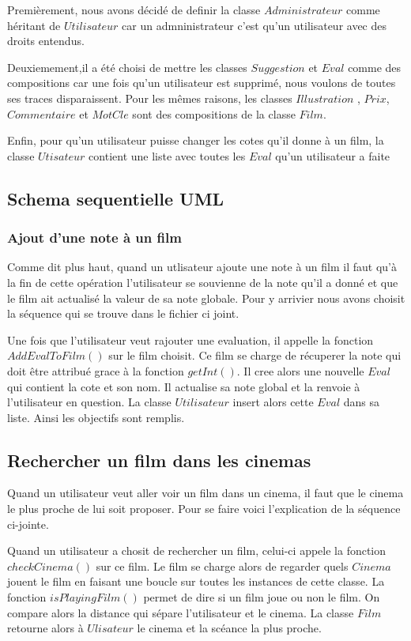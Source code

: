 \documentclass[10pt,a4paper]{article}
\begin{document}
	
	Premièrement, nous avons décidé de definir la classe $Administrateur$ comme héritant de $Utilisateur$ car un admninistrateur c'est qu'un utilisateur avec des droits entendus. 
	
	Deuxiemement,il a été choisi de mettre les classes $Suggestion$ et $Eval$ comme des compositions car une fois qu'un utilisateur est supprimé, nous voulons de toutes ses traces disparaissent. Pour les mêmes raisons, les classes $Illustration$ , $Prix$, $Commentaire$ et $MotCle$ sont des compositions de la classe $Film$.
	
	Enfin, pour qu'un utilisateur puisse changer les cotes qu'il donne à un film, la classe $Utisateur$ contient une liste avec toutes les $Eval$ qu'un utilisateur a faite
	
		
\subsection{Schema sequentielle UML}
	\subsubsection{Ajout d'une note à un film}
	Comme dit plus haut, quand un utlisateur ajoute une note à un film il faut qu'à la fin de cette opération l'utilisateur se souvienne de la note qu'il a donné et que le film ait actualisé la valeur de sa note globale. Pour y arrivier nous avons choisit la séquence qui se trouve dans le fichier ci joint.
	
	Une fois que l'utilisateur veut rajouter une evaluation, il appelle la fonction $AddEvalToFilm()$ sur le film choisit. Ce film se charge de récuperer la note qui doit être attribué grace à la fonction $getInt()$. Il cree alors une nouvelle $Eval$ qui contient la cote et son nom. Il actualise sa note global et la renvoie à l'utilisateur en question. La classe $Utilisateur$ insert alors cette $Eval$ dans sa liste. Ainsi les objectifs sont remplis. 
	
	\subsection{Rechercher un film dans les cinemas}
	Quand un utilisateur veut aller voir un film dans un cinema, il faut que le cinema le plus proche de lui soit proposer. Pour se faire voici l'explication de la séquence ci-jointe.
	
	Quand un utilisateur a chosit de rechercher un film, celui-ci appele la fonction $checkCinema()$ sur ce film. Le film se charge alors de regarder quels $Cinema$ jouent le film en faisant une boucle sur toutes les instances de cette classe. La fonction $isPlayingFilm()$ permet de dire si un film joue ou non le film. On compare alors la distance qui sépare l'utilisateur et le cinema. La classe $Film$ retourne alors à $Ulisateur$ le cinema et la scéance la plus proche. 
	
\end{document}
